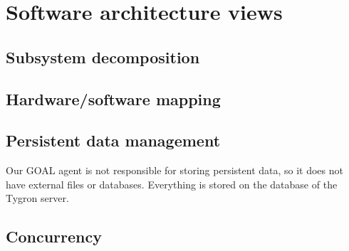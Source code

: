 \label{Software architecture views}
\section{Software architecture views}

\subsection{Subsystem decomposition}
\subsection{Hardware/software mapping}
\subsection{Persistent data management}
Our GOAL agent is not responsible for storing persistent data, so it does not have external files or databases. Everything is stored on the database of the Tygron server.
\subsection{Concurrency}

\newpage
